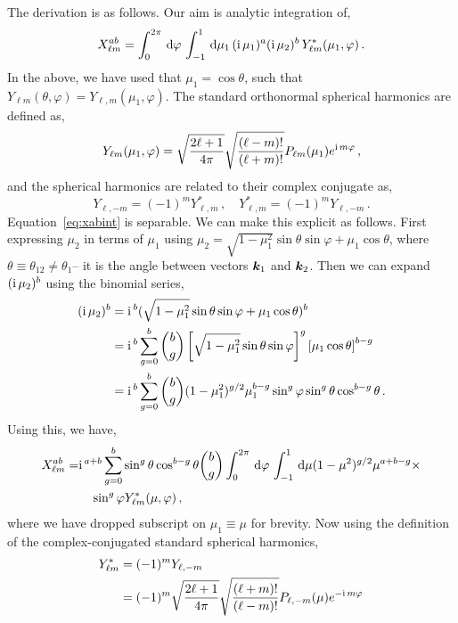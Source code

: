 The derivation is as follows. Our aim is analytic integration of, 
\begin{equation} \label{eq:xabint}
X_{\ell m}^{ab} = \int_0^{2\pi} \,\mathrm{d}\varphi\, \int_{-1}^1 \,\mathrm{d}\mu_1\, (\mathrm{i\,} \mu_1)^a (\mathrm{i\,} \mu_2)^b \,Y_{\ell m}^*(\mu_1,\varphi)\,.
\end{equation}
In the above, we have used that $\mu_1 = \cos \theta$, such that $Y_{\ell m} (\theta, \varphi) = Y_{\ell,m}(\mu_1,\varphi)$. 
The standard orthonormal spherical harmonics are defined as, 
\begin{equation}
	Y_{\ell m}(\mu_1, \varphi) = \sqrt{\frac{2\ell+1}{4\pi}} \sqrt{\frac{(\ell - m)!}{(\ell + m)!}} P_{\ell m}(\mu_1) e^{\mathrm{i\,} m \varphi}\,,
\end{equation}
and the spherical harmonics are related to their complex conjugate as, 
\begin{equation}
	Y_{\ell,-m} = (-1)^m Y^*_{\ell,m}\,,\quad Y^*_{\ell,m} = (-1)^m Y_{\ell,-m}\,.
\end{equation}
Equation~\eqref{eq:xabint} is separable. We can make this explicit as follows. First expressing $\mu_2$ in terms of $\mu_1$ using $\mu_2 = \sqrt{1 - \mu_1^2} \sin\theta \sin\varphi + \mu_1 \cos\theta$, where $\theta \equiv \theta_{12} \neq \theta_1$-- it is the angle between vectors $\bm {k}_1$ and $\bm {k}_2$. Then we can expand $(\mathrm{i\,}\mu_2)^b$ using the binomial series, 
\begin{align}
	(\mathrm{i\,} \mu_2)^b &= \mathrm{i\,}^b ( \sqrt{1 - \mu_1^2} \sin\theta \sin\varphi + \mu_1 \cos\theta)^b \nonumber \\ 
	&= \mathrm{i\,}^b \sum_{g=0}^b \binom{b}{g} \left[ \sqrt{1 - \mu_1^2} \sin\theta \sin\varphi \right]^g \left[ \mu_1 \cos\theta \right]^{b-g}\nonumber \\
	&= \mathrm{i\,}^b \sum_{g=0}^b \binom{b}{g} (1 - \mu_1^2)^{g/2} \mu_1^{b-g} \sin^g\varphi \sin^g\theta \cos^{b-g}\theta\,.
\end{align}
Using this, we have,
\begin{align}
	X_{\ell m}^{ab} =& \mathrm{i\,}^{a+b} \sum_{g=0}^b \sin^g\theta \cos^{b-g}\theta \binom{b}{g} \int_0^{2\pi}\,\mathrm{d}\varphi\, \int_{-1}^1\,\mathrm{d}\mu (1-\mu^2)^{g/2} \mu^{a+b-g} \times \nonumber \\
	&\quad \sin^g\varphi Y^*_{\ell m}(\mu,\varphi)\,,
\end{align}
where we have dropped subscript on $\mu_1 \equiv \mu$ for brevity. Now using the definition of the complex-conjugated standard spherical harmonics, 
\begin{align}
	Y^*_{\ell m} &= (-1)^m Y_{\ell,-m} \nonumber \\
	&= (-1)^m \sqrt{\frac{2\ell + 1}{4 \pi}} \sqrt{\frac{(\ell +m)!}{(\ell - m)!}} P_{\ell,-m}(\mu) e^{-\mathrm{i\,} m \varphi} \,
\end{align}
